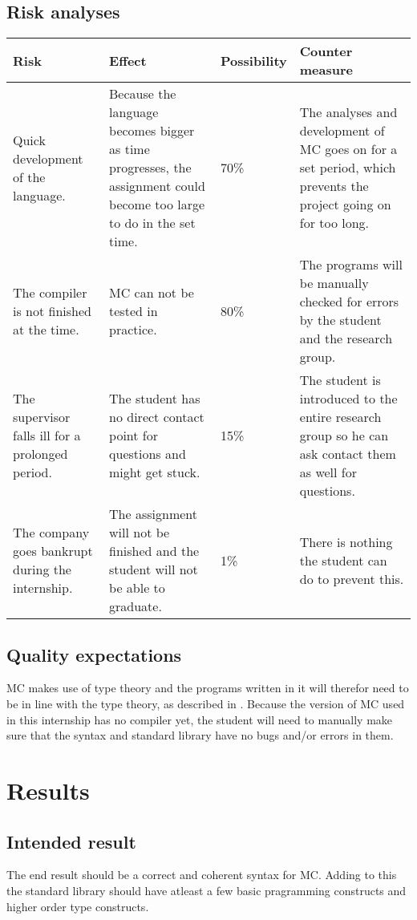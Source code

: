\subsection{Risk analyses}
\begin{center}
   \begin{tabular}
      {| p{} | p{} | l | p{} |}
      \hline
      \textbf{Risk} & \textbf{Effect} & \textbf{Possibility} & \textbf{Counter measure}
      \\ \hline
      Quick development of the language. & Because the language becomes bigger as time progresses, the assignment could become too large to do in the set time. & 70\% & The analyses and development of MC goes on for a set period, which prevents the project going on for too long.
      \\ \hline
      The compiler is not finished at the time. & MC can not be tested in practice. & 80\% & The programs will be manually checked for errors by the student and the research group.
      \\ \hline
      The supervisor falls ill for a prolonged period. & The student has no direct contact point for questions and might get stuck. & 15\% & The student is introduced to the entire research group so he can ask contact them as well for questions.
      \\ \hline
      The company goes bankrupt during the internship. & The assignment will not be finished and the student will not be able to graduate. & 1\% & There is nothing the student can do to prevent this.
      \\ \hline
   \end{tabular}
\end{center}

\subsection{Quality expectations}
MC makes use of type theory and the programs written in it will therefor need to be in line with the type theory, as described in \cite{pierce2002types}.
Because the version of MC used in this internship has no compiler yet, the student will need to manually make sure that the syntax and standard library have no bugs and/or errors in them.

\section{Results}
\subsection{Intended result}
The end result should be a correct and coherent syntax for MC.
Adding to this the standard library should have atleast a few basic pragramming constructs and higher order type constructs.





\begin{appendices}
   
\end{appendices}

